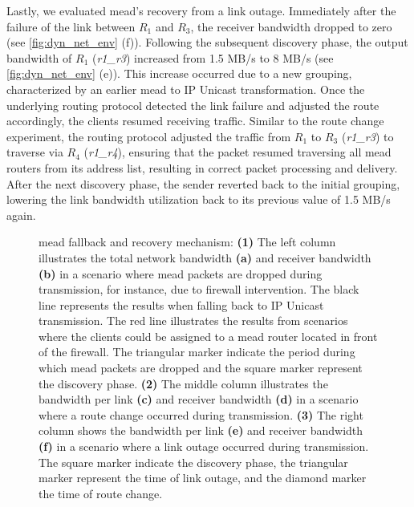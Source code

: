 Lastly, we evaluated \gls{mead}'s recovery from a link outage.
Immediately after the failure of the link between $R_1$ and $R_3$, the receiver
    bandwidth dropped to zero (see \autoref{fig:dyn_net_env} (f)).
Following the subsequent discovery phase, the output bandwidth of $R_1$
    (\textit{r1\_r3}) increased from 1.5 MB/s to 8 MB/s (see
    \autoref{fig:dyn_net_env} (e)).
This increase occurred due to a new grouping, characterized by an earlier
    \gls{mead} to IP Unicast transformation.
Once the underlying routing protocol detected the link failure and adjusted
    the route accordingly, the clients resumed receiving traffic.
Similar to the route change experiment, the routing protocol adjusted the
    traffic from $R_1$ to $R_3$ (\textit{r1\_r3}) to traverse via $R_4$
    (\textit{r1\_r4}), ensuring that the packet resumed traversing all
    \gls{mead} routers from its address list, resulting in correct packet
    processing and delivery.
After the next discovery phase, the sender reverted back to the initial
    grouping, lowering the link bandwidth utilization back to its previous
    value of 1.5 MB/s again.

\begin{figure}
    \begin{center}
        
    \end{center}
    \caption[MEADcast fallback and recovery mechanism]{
        \nuciii{} \gls{mead} fallback and recovery mechanism:
        \textbf{(1)} The left column illustrates the total network bandwidth
            \textbf{(a)} and receiver bandwidth \textbf{(b)} in a scenario
            where \gls{mead} packets are dropped during transmission, for
            instance, due to firewall intervention.
        The black line represents the results when falling back to IP Unicast
            transmission.
        The red line illustrates the results from scenarios where the clients
            could be assigned to a \gls{mead} router located in front of the
            firewall.
        The triangular marker indicate the period during which \gls{mead} packets
            are dropped and the square marker represent the discovery phase.
        \textbf{(2)} The middle column illustrates the bandwidth per link
            \textbf{(c)} and receiver bandwidth \textbf{(d)} in a scenario
            where a route change occurred during transmission.
        \textbf{(3)} The right column  shows the bandwidth per link
            \textbf{(e)} and receiver bandwidth \textbf{(f)} in a scenario
            where a link outage occurred during transmission.
        The square marker indicate the discovery phase, the triangular marker
            represent the time of link outage, and the diamond marker the time 
            of route change.
        }
    \label{fig:dyn_net_env}
\end{figure}

